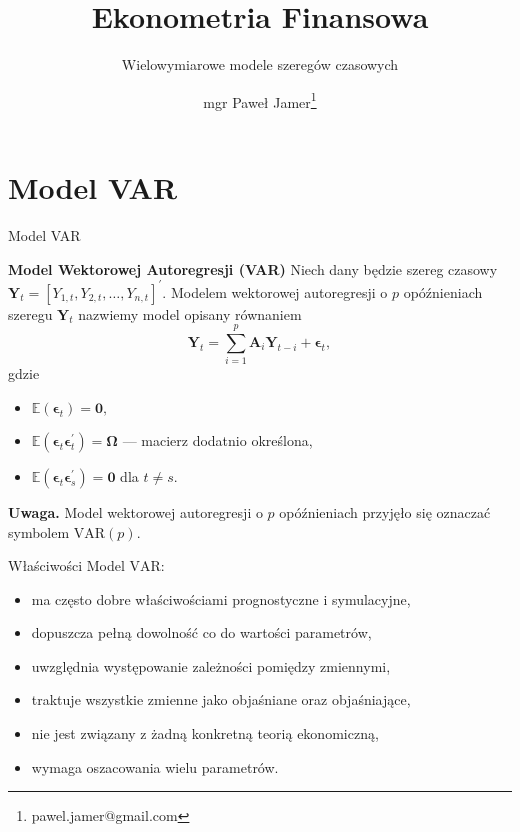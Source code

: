 \documentclass[a4paper, 11pt]{beamer}
\title{Ekonometria Finansowa}
\subtitle{Wielowymiarowe modele szeregów czasowych}
\author{mgr Paweł Jamer\thanks{pawel.jamer@gmail.com}}
\begin{document}
	\begin{frame}
		\titlepage
	\end{frame}
	
	\section{Model VAR}
	
	\begin{frame}{Model VAR}
		\begin{block}{\textbf{Model Wektorowej Autoregresji (VAR)}}
			Niech dany będzie szereg czasowy $\boldsymbol{Y}_{t} = 
			\left[Y_{1,t}, Y_{2,t}, \ldots, Y_{n,t}\right]^{\prime}.$ 
			Modelem wektorowej autoregresji o $p$ opóźnieniach szeregu 
			$\boldsymbol{Y}_{t}$ nazwiemy model opisany równaniem
			\[
				\boldsymbol{Y}_{t} =
					\sum_{i=1}^{p}
						\boldsymbol{A}_{i} \boldsymbol{Y}_{t-i} +
						\boldsymbol{\epsilon}_{t},
			\]
			gdzie
			\begin{itemize}
				\item $\mathbb{E}\left(\boldsymbol{\epsilon}_{t}\right) = 
					\boldsymbol{0},$
				\item $\mathbb{E}\left(
					\boldsymbol{\epsilon}_{t}
					\boldsymbol{\epsilon}_{t}^{\prime}
				\right) = \boldsymbol{\Omega}$ --- macierz dodatnio 
				określona,
				\item $\mathbb{E}\left(
					\boldsymbol{\epsilon}_{t}
					\boldsymbol{\epsilon}_{s}^{\prime}
				\right) = \boldsymbol{0}$ dla $t \neq s.$
			\end{itemize}
		\end{block}
		\begin{alert}{\textbf{Uwaga.}}
			Model wektorowej autoregresji o $p$ opóźnieniach przyjęło 
			się oznaczać symbolem $\mbox{VAR}\left(p\right).$
		\end{alert}
	\end{frame}
	
	\begin{frame}{Właściwości}
		Model $\mbox{VAR}:$
		\begin{itemize}
			\item ma często dobre właściwościami prognostyczne i 
				symulacyjne,
			\item dopuszcza pełną dowolność co do wartości parametrów,
			\item uwzględnia występowanie zależności pomiędzy zmiennymi,
			\item traktuje wszystkie zmienne jako objaśniane oraz 
				objaśniające,
			\item nie jest związany z żadną konkretną teorią 
				ekonomiczną,
			\item wymaga oszacowania wielu parametrów.
		\end{itemize}
	\end{frame}
	
\end{document}
